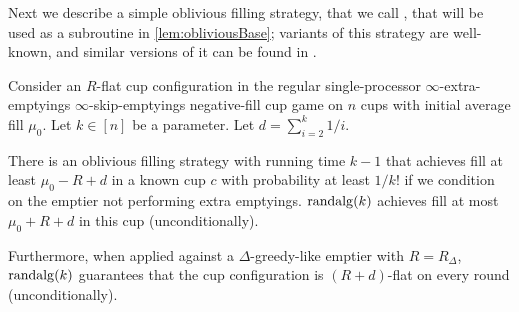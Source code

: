 
Next we describe a simple oblivious filling strategy, that we
call , that will be used as a subroutine in
\cref{lem:obliviousBase}; variants of this strategy
are well-known, and similar versions of it can be found in \cite{
BenderFaKu19, DietzRa91, Kuszmaul20}.
\begin{proposition}
  \label{prop:randalg}
  Consider an $R$-flat cup configuration in the regular single-processor
  $\infty$-extra-emptyings $\infty$-skip-emptyings negative-fill cup
  game on $n$ cups with initial average fill $\mu_0$.
  Let $k \in [n]$ be a parameter. Let $d = \sum_{i=2}^k 1/i$.

  There is an oblivious filling strategy 
  with running time $k-1$ that achieves fill at least $\mu_0 -R +
  d$ in a known cup $c$ with probability at least $1/k!$ if
  we condition on the emptier not performing extra emptyings.
  $\operatorname{\text{\textup{randalg}}}(k)$ achieves fill at most $\mu_0 + R + d$ in this cup
  (unconditionally).

  Furthermore, when applied against a $\Delta$-greedy-like emptier
  with $R = R_\Delta$, $\operatorname{\text{\textup{randalg}}}(k)$ guarantees that
  the cup configuration is $(R + d)$-flat on every round
  (unconditionally).
\end{proposition}
